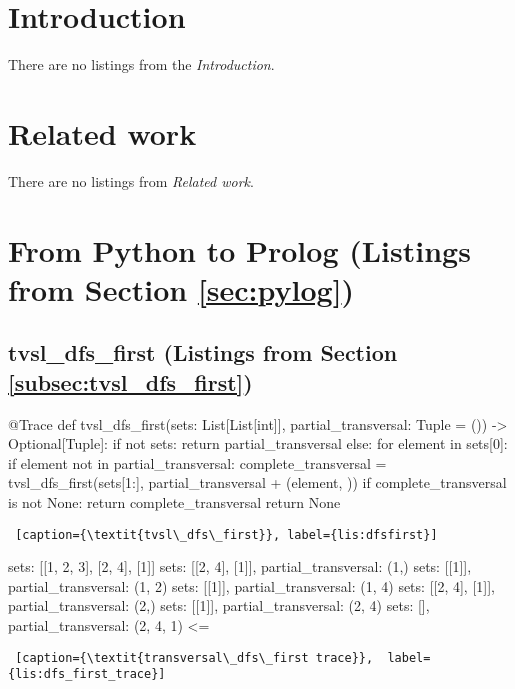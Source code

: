 \appendix 

\newpage
\section{Introduction} 
There are no listings from the \textit{Introduction}.

\section{Related work} 
There are no listings from \textit{Related work}.

\section{From Python to Prolog (Listings from Section \ref{sec:pylog})} \label{appsec:pylog}

\subsection{tvsl\_dfs\_first (Listings from Section \ref{subsec:tvsl_dfs_first})} \label{appsubsec:tvsl_dfs_first}

\begin{minipage}{\linewidth}   \hrulefill
\begin{python}[numbers=left]
@Trace
def tvsl_dfs_first(sets: List[List[int]], partial_transversal: Tuple = ()) -> Optional[Tuple]:
  if not sets:
    return partial_transversal
  else:
    for element in sets[0]:
      if element not in partial_transversal:
        complete_transversal = tvsl_dfs_first(sets[1:], partial_transversal + (element, ))
        if complete_transversal is not None:
          return complete_transversal 
    return None
\end{python}
\begin{lstlisting} [caption={\textit{tvsl\_dfs\_first}}, label={lis:dfsfirst}]
\end{lstlisting}
\end{minipage}

\noindent
\begin{minipage}{\linewidth}
\largev   
\begin{python}[numbers=left]
sets: [[1, 2, 3], [2, 4], [1]]
  sets: [[2, 4], [1]], partial_transversal: (1,)
    sets: [[1]], partial_transversal: (1, 2)
    sets: [[1]], partial_transversal: (1, 4)
  sets: [[2, 4], [1]], partial_transversal: (2,)
    sets: [[1]], partial_transversal: (2, 4)
      sets: [], partial_transversal: (2, 4, 1) <=
\end{python}
\begin{lstlisting} [caption={\textit{transversal\_dfs\_first trace}},  label={lis:dfs_first_trace}]
\end{lstlisting}
\end{minipage}

